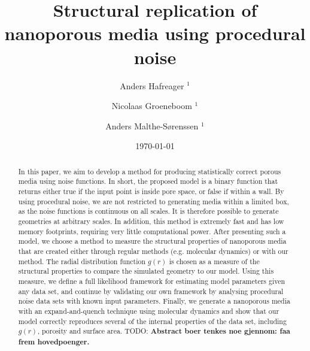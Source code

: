 \documentclass[aps,pre,twocolumn,letterpaper,floatfix,showpacs]{revtex4}
\newcommand{\todo}[1]{ {\color{Magenta} TODO: \color{Blue} \textbf{#1} }}
\begin{document}
\title{Structural replication of nanoporous media using procedural noise}
\author{Anders Hafreager $^{1}$} 
\author{Nicolaas Groeneboom $^{1}$} 
\author{Anders Malthe-S\o renssen $^1$}
\date{\today} 

\begin{abstract} 
In this paper, we aim to develop a method for producing statistically correct porous media using noise functions. In short, the proposed model is a binary function that returns either true if the input point is inside pore space, or false if within a wall. By using procedural noise, we are not restricted to generating media within a limited box, as the noise functions is continuous on all scales. It is therefore possible to generate geometries at arbitrary scales. In addition, this method is extremely fast and has low memory footprints, requiring very little computational power. After presenting such a model, we choose a method to measure the structural properties of nanoporous media that are created either through regular methods (e.g. molecular dynamics) or with our method. The radial distribution function $g(r)$ is chosen as a measure of the structural properties to compare the simulated geometry to our model. Using this measure, we define a full likelihood framework for estimating model parameters given any data set, and continue by validating our own framework by analysing procedural noise data sets with known input parameters. Finally, we generate a nanoporous media with an expand-and-quench technique using molecular dynamics and show that our model correctly reproduces several of the internal properties of the data set, including $g(r)$, porosity and surface area.  \todo{Abstract boer tenkes noe gjennom: faa frem hovedpoenger.}   

\end{abstract} 
 
\maketitle
 
\end{document}
